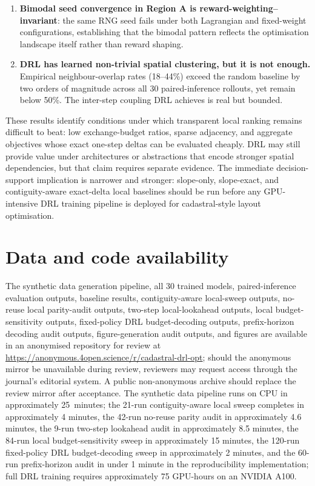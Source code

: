 \documentclass[]{interact}
\theoremstyle{plain}
\begin{document}
\begin{enumerate}
\item \textbf{Bimodal seed convergence in Region A is reward-weighting--invariant}: the same RNG seed fails under both Lagrangian and fixed-weight configurations, establishing that the bimodal pattern reflects the optimisation landscape itself rather than reward shaping.

\item \textbf{DRL has learned non-trivial spatial clustering, but it is not enough.} Empirical neighbour-overlap rates (18--44\%) exceed the random baseline by two orders of magnitude across all 30 paired-inference rollouts, yet remain below 50\%. The inter-step coupling DRL achieves is real but bounded.
\end{enumerate}

These results identify conditions under which transparent local ranking remains difficult to beat: low exchange-budget ratios, sparse adjacency, and aggregate objectives whose exact one-step deltas can be evaluated cheaply. DRL may still provide value under architectures or abstractions that encode stronger spatial dependencies, but that claim requires separate evidence. The immediate decision-support implication is narrower and stronger: slope-only, slope-exact, and contiguity-aware exact-delta local baselines should be run before any GPU-intensive DRL training pipeline is deployed for cadastral-style layout optimisation.

\section*{Data and code availability}

The synthetic data generation pipeline, all 30 trained models, paired-inference evaluation outputs, baseline results, contiguity-aware local-sweep outputs, no-reuse local parity-audit outputs, two-step local-lookahead outputs, local budget-sensitivity outputs, fixed-policy DRL budget-decoding outputs, prefix-horizon decoding audit outputs, figure-generation audit outputs, and figures are available in an anonymised repository for review at \url{https://anonymous.4open.science/r/cadastral-drl-opt}; should the anonymous mirror be unavailable during review, reviewers may request access through the journal's editorial system. A public non-anonymous archive should replace the review mirror after acceptance. The synthetic data pipeline runs on CPU in approximately 25~minutes; the 21-run contiguity-aware local sweep completes in approximately 4 minutes, the 42-run no-reuse parity audit in approximately 4.6 minutes, the 9-run two-step lookahead audit in approximately 8.5 minutes, the 84-run local budget-sensitivity sweep in approximately 15 minutes, the 120-run fixed-policy DRL budget-decoding sweep in approximately 2 minutes, and the 60-run prefix-horizon audit in under 1 minute in the reproducibility implementation; full DRL training requires approximately 75 GPU-hours on an NVIDIA A100.
\end{document}
